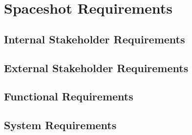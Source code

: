 \section{Spaceshot Requirements} \label{section:requirements}
\subsection{Internal Stakeholder Requirements}
\subsection{External Stakeholder Requirements}
\subsection{Functional Requirements}
\subsection{System Requirements}

